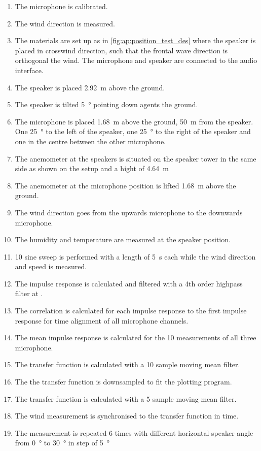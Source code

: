 \begin{enumerate}
\item The microphone is calibrated.
\item The wind direction is measured.
\item The materials are set up as in \autoref{fig:ap:position_test_des} where the speaker is placed in crosswind direction, such that the frontal wave direction is orthogonal the wind. The microphone and speaker are connected to the audio interface.
\item The speaker is placed \SI{2.92}{\meter} above the ground.
\item The speaker is tilted \SI{5}{\degree} pointing down agents the ground.
\item The microphone is placed \SI{1.68}{\meter} above the ground, \SI{50}{\meter} from the speaker. One \SI{25}{\degree} to the left of the speaker, one \SI{25}{\degree} to the right of the speaker and one in the centre between the other microphone.
\item The anemometer at the speakers is situated on the speaker tower in the same side as shown on the setup and a hight of \SI{4.64}{\meter}
\item The anemometer at the microphone position is lifted \SI{1.68}{\meter} above the ground.
\item The wind direction goes from the upwards microphone to the downwards microphone.
\item The humidity and temperature are measured at the speaker position.
\item 10 sine sweep is performed with a length of \SI{5}{\second} each while the wind direction and speed is measured.
\item The impulse response is calculated and filtered with a 4th order highpass filter at .
\item The correlation is calculated for each impulse response to the first impulse response for time alignment \citep{gunness2001loudspeaker} of all microphone channels.
\item The mean impulse response is calculated for the 10 measurements of all three microphone.
\item The transfer function is calculated with a 10 sample moving mean filter.
\item The the transfer function is downsampled to fit the plotting program.
\item The transfer function is calculated with a 5 sample moving mean filter.
\item The wind measurement is synchronised to the transfer function in time. 
\item The measurement is repeated 6 times with different horizontal speaker angle from \SI{0}{\degree} to \SI{30}{\degree} in step of \SI{5}{\degree}
\end{enumerate}



